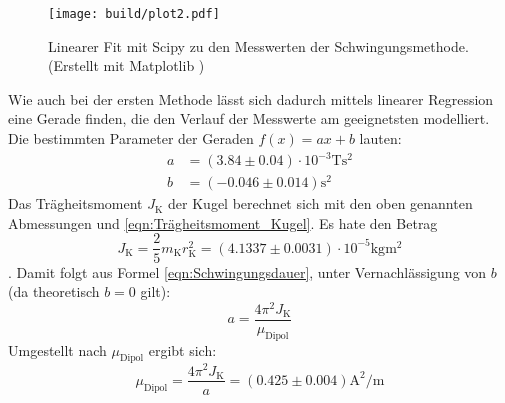 \begin{figure}
    \centering
    \texttt{[image: build/plot2.pdf]}
    \caption{Linearer Fit mit Scipy \cite{scipy} zu den Messwerten der Schwingungsmethode. (Erstellt mit Matplotlib \cite{matplotlib})}
    \label{fig:Plot2}
\end{figure} 

Wie auch bei der ersten Methode lässt sich dadurch mittels linearer Regression eine Gerade finden, die den Verlauf der Messwerte am geeignetsten modelliert.
Die bestimmten Parameter der Geraden $f(x) = ax + b$  lauten:
\begin{align*}
    a &= (3.84 \pm 0.04) \cdot 10^{-3} \unit{\tesla\second\squared} \\
    b &= (-0.046 \pm 0.014) \unit{\second\squared}
\end{align*}
Das Trägheitsmoment $J_\text{K}$ der Kugel berechnet sich mit den oben genannten Abmessungen und \autoref{eqn:Trägheitsmoment_Kugel}. Es hate den Betrag
\begin{equation*}
    J_\text{K} = \frac{2}{5} m_{\text{K}} r_{\text{K}}^2 = (4.1337 \pm 0.0031) \cdot 10^{-5} \unit{\kilogram\meter\squared}  
\end{equation*}
.
Damit folgt aus Formel \eqref{eqn:Schwingungsdauer}, unter Vernachlässigung von $b$ (da theoretisch $b = 0$ gilt):
\begin{equation*}
    a = \frac{4 \pi^2 J_{\text{K}}}{\mu_{\text{Dipol}}}
\end{equation*}
Umgestellt nach $\mu_{\text{Dipol}}$ ergibt sich:
\begin{equation}
    \label{eqn:mu2}
    \mu_{\text{Dipol}} = \frac{4 \pi^2 J_{\text{K}}}{a} = (0.425 \pm 0.004) \unit{\ampere\squared\per\metre}
\end{equation}
